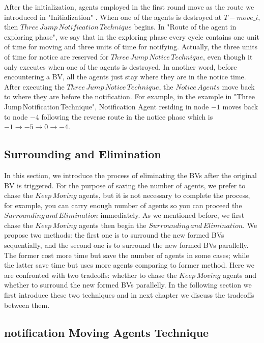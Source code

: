 \documentclass[conference]{IEEEtran}
\begin{document}

After the initialization, agents employed in the first round move as the route we introduced in "Initialization" . When one of the agents is destroyed at $T-{move\_i}$, then $Three\,Jump\,Notification\,Technique$ begins. In "Route of the agent in exploring phase", we say that in the exploring phase every cycle contains one unit of time for moving and three units of time for notifying. Actually, the three units of time for notice are reserved for $Three\,Jump\, Notice\,Technique$, even though it only executes when one of the agents is destroyed. In another word, before encountering a BV, all the agents just stay where they are in the notice time.
After executing the $Three\,Jump\,Notice\,Technique$, the $Notice\,Agents$ move back to where they are before the notification. For example, in the example in "Three\,Jump\,Notification\,Technique", Notification Agent residing in node $-1$ moves back to node $-4$ following the reverse route in the notice phase which is $-1{\rightarrow}-5{\rightarrow}0{\rightarrow}-4$. 

\subsection{Surrounding and Elimination}
In this section, we introduce the process of eliminating the BVs after the original BV is triggered. For the purpose of saving the number of agents, we prefer to chase the $Keep\,Moving$ agents, but it is not necessary to complete the process, for example, you can carry enough number of agents so you can proceed the $Surrounding\,and\,Elimination$ immediately. As we mentioned before, we first chase the $Keep\,Moving$ agents then begin the $Surrounding\,and\,Elimination$. We propose two methods: the first one is to surround the new formed BVs sequentially, and the second one is to surround the new formed BVs parallelly. The former cost more time but save the number of agents in some cases; while the latter save time but uses more agents comparing to former method. Here we are confronted with two tradeoffs: whether to chase the $Keep\,Moving$ agents and whether to surround the new formed BVs parallelly. In the following section we first introduce these two techniques and in next chapter we discuss the tradeoffs between them.


\subsection{notification Moving Agents Technique}
\end{document}

